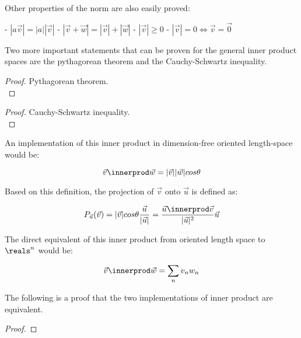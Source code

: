 Other properties of the norm are also easily proved:


    - $|a\vec{v}| = |a||\vec{v}|$
    - $|\vec{v} + \vec{w}| = |\vec{v}| + |\vec{w}|$
    - $|\vec{v}| \geq 0$
    - $|\vec{v}| = 0 \iff \vec{v} = \vec{0}$


Two more important statements that can be proven for the general inner product spaces are the pythagorean theorem and the Cauchy-Schwartz inequality. 

\begin{proof}
    Pythagorean theorem.\\
\end{proof}


\begin{proof}
    Cauchy-Schwartz inequality.\\
\end{proof}


An implementation of this inner product in dimension-free oriented length-space would be:

$$\vec{v} \innerprod \vec{w} = |\vec{v}||\vec{w}|cos\theta$$

Based on this definition, the projection of $\vec{v}$ onto $\vec{u}$ is defined as: 

$$ P_{\vec{u}}(\vec{v}) = |\vec{v}| cos\theta \frac{\vec{u}}{|\vec{u}|} = \frac{\vec{u} \innerprod \vec{v}}{|\vec{u}|^2} \vec{u} $$

The direct equivalent of this inner product from oriented length space to $\reals^n$ would be:

$$ \vec{v} \innerprod \vec{w} = \sum_n v_n w_n $$

The following is a proof that the two implementations of inner product are equivalent. 

\begin{proof}
\end{proof}

